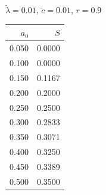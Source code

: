 \documentclass[11pt,a4paper]{article}
\begin{document}
\begin{minipage}[t]{\textwidth}
\begin{minipage}[t]{0.32\textwidth}
        \footnotesize
        \begin{flushleft}$\tilde{\lambda}=0.01$, $\tilde{c}=0.01$, $r=0.9$\end{flushleft}
        \begin{tabular}[t]{rr}
            $a_0$ & $S$ \\
            \hline
             0.050 & 0.0000 \\
             0.100 & 0.0000 \\
             0.150 & 0.1167 \\
             0.200 & 0.2000 \\
             0.250 & 0.2500 \\
             0.300 & 0.2833 \\
             0.350 & 0.3071 \\
             0.400 & 0.3250 \\
             0.450 & 0.3389 \\
             0.500 & 0.3500 \\
        \end{tabular}
    \end{minipage}
\end{minipage}
\end{document}
